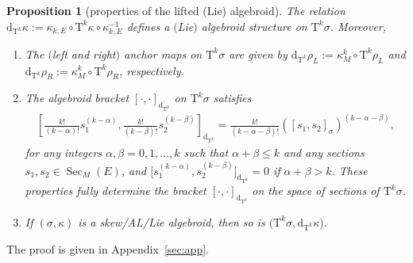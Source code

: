 \documentclass[10pt,a4paper]{amsart}
\newcommand{\Sec}{\operatorname{Sec}}
\newcommand{\dd}{\mathrm{d}}
\newcommand{\rhoL}{\rho_L} %
\newcommand{\rhoR}{\rho_R}
\newcommand{\TT}[1]{\mathrm{T}^{#1}} %
\numberwithin{equation}{section}
\newtheorem{prop}[thm]{Proposition}
\theoremstyle{definition}
\begin{document}
\begin{prop}[properties of the lifted (Lie) algebroid]\label{p:algebroid_Tk_E} The relation $\dd_{\TT{k}}\kappa:=\kappa_{k, E}\circ\TT{k} \kappa\circ\kappa_{k, E}^{-1}$ defines a $($Lie$)$ algebroid structure on $\TT{k}\sigma$. Moreover,
\begin{enumerate}[$(i)$]\itemsep=0pt
\item The $($left and right$)$ anchor maps on $\TT{k} \sigma$ are given by $\dd_{\TT{k}}\rhoL:=\kappa^k_M\circ\TT{k}\rhoL$ and $\dd_{\TT{k}}\rhoR:=\kappa^k_M\circ\TT{k}\rhoR$, respectively.
\item \label{p:algebroid_Tk_E_item_bracket} The algebroid bracket $[\cdot,\cdot]_{\dd_{\TT{k}}}$ on $\TT{k}\sigma$ satisfies
\begin{gather}\label{p:algebroid_Tk_E_item_bracket_formula}
\left[ \frac{k!}{(k-\alpha)!} s_1^{(k-\alpha)}, \frac{k!}{(k-\beta)!} s_2^{(k-\beta)}\right]_{\dd_{\TT{k}}} = \frac{k!}{(k-\alpha-\beta)!} ([s_1, s_2]_{\sigma})^{(k-\alpha-\beta)},
\end{gather}
for any integers $\alpha,\beta=0,1,\hdots,k$ such that $\alpha + \beta \leq k$ and any sections $s_1,s_2\in\Sec_M(E)$, and $\big[s_1^{(k-\alpha)}, s_2^{(k-\beta)}\big]_{\dd_{\TT{k}}} = 0$ if $\alpha+\beta>k$. These properties fully determine the bracket $[\cdot,\cdot]_{\dd_{\TT{k}}}$ on the space of sections of $\TT{k}\sigma$.
\item \label{p:algebroid_Tk_E_item_Tk_E_is_Lie} If $(\sigma,\kappa)$ is a skew/AL/Lie algebroid, then so is $\big(\TT{k} \sigma,\dd_{\TT{k}}\kappa\big)$.
\end{enumerate}
\end{prop}
The proof is given in Appendix~\ref{sec:app}.
\end{document}
